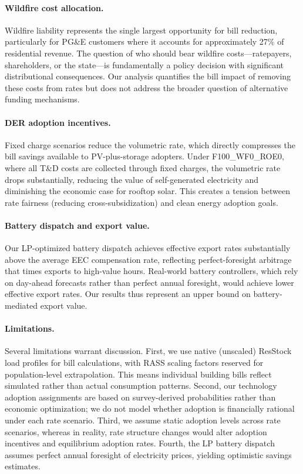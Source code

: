 \documentclass[9pt,twocolumn,twoside]{pnas-new}
\begin{document}
\paragraph{Wildfire cost allocation.}
Wildfire liability represents the single largest opportunity for bill reduction, particularly for PG\&E customers where it accounts for approximately 27\% of residential revenue. The question of who should bear wildfire costs---ratepayers, shareholders, or the state---is fundamentally a policy decision with significant distributional consequences. Our analysis quantifies the bill impact of removing these costs from rates but does not address the broader question of alternative funding mechanisms.

\paragraph{DER adoption incentives.}
Fixed charge scenarios reduce the volumetric rate, which directly compresses the bill savings available to PV-plus-storage adopters. Under F100\_WF0\_ROE0, where all T\&D costs are collected through fixed charges, the volumetric rate drops substantially, reducing the value of self-generated electricity and diminishing the economic case for rooftop solar. This creates a tension between rate fairness (reducing cross-subsidization) and clean energy adoption goals.

\paragraph{Battery dispatch and export value.}
Our LP-optimized battery dispatch achieves effective export rates substantially above the average EEC compensation rate, reflecting perfect-foresight arbitrage that times exports to high-value hours. Real-world battery controllers, which rely on day-ahead forecasts rather than perfect annual foresight, would achieve lower effective export rates. Our results thus represent an upper bound on battery-mediated export value.

\paragraph{Limitations.}
Several limitations warrant discussion. First, we use native (unscaled) ResStock load profiles for bill calculations, with RASS scaling factors reserved for population-level extrapolation. This means individual building bills reflect simulated rather than actual consumption patterns. Second, our technology adoption assignments are based on survey-derived probabilities rather than economic optimization; we do not model whether adoption is financially rational under each rate scenario. Third, we assume static adoption levels across rate scenarios, whereas in reality, rate structure changes would alter adoption incentives and equilibrium adoption rates. Fourth, the LP battery dispatch assumes perfect annual foresight of electricity prices, yielding optimistic savings estimates.
\end{document}
